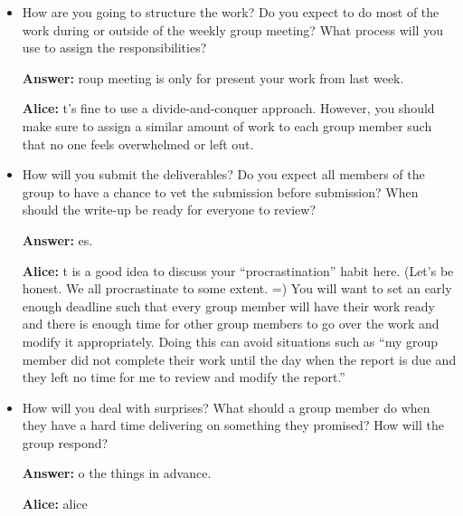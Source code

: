 \documentclass[12pt]{article}
\newenvironment{answer}[1]{
\color{blue}
	{\bf Answer:}
}{
}
\newenvironment{alice}[1]{
\color{magenta}
	{\bf Alice:}
}{
}
\begin{document}
\begin{itemize}
\item How are you going to structure the work? Do you expect to do most of the work during or outside of the weekly group meeting? What process will you use to assign the responsibilities?

\begin{answer}

Group meeting is only for present your work from last week.
\end{answer}

\begin{alice}

It's fine to use a divide-and-conquer approach.  However, you should make sure to assign a similar amount of work to each group member such that no one feels overwhelmed or left out.  
\end{alice}

\item How will you submit the deliverables? Do you expect all members of the group to have a chance to vet the submission before submission? When should the write-up be ready for everyone to review?

\begin{answer}

Yes.
\end{answer}

\begin{alice}

It is a good idea to discuss your ``procrastination'' habit here.  (Let's be honest.  We all procrastinate to some extent. =)  You will want to set an early enough deadline such that every group member will have their work ready and there is enough time for other group members to go over the work and modify it appropriately.  Doing this can avoid situations such as ``my group member did not complete their work until the day when the report is due and they left no time for me to review and modify the report.''
\end{alice}

\item How will you deal with surprises? What should a group member do when they have a hard time delivering on something they promised? How will the group respond?

\begin{answer}

Do the things in advance.
\end{answer}

\begin{alice}


\end{alice}
\end{itemize}
\end{document}
